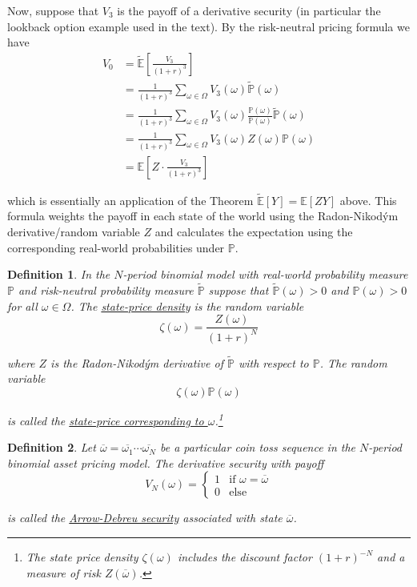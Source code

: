 \documentclass[12pt]{article}
\newtheorem{definition}{Definition}
\newlength\tindent
\renewcommand{\indent}{\hspace*{\tindent}}
\renewcommand{\P}{\mathbb P}
\newcommand{\E}{\mathbb E}
\begin{document}
\indent Now, suppose that $V_3$ is the payoff of a derivative security (in particular the lookback option example used in the text). By the risk-neutral pricing formula we have
\begin{align*}
	V_0 &= \tilde{\E} \left[ \frac{V_3}{(1 + r)^3} \right] \\
	&= \frac{1}{(1 + r)^3} \sum_{\omega\in\Omega} V_3(\omega)\tilde{\P}(\omega) \\
	&= \frac{1}{(1 + r)^3} \sum_{\omega\in\Omega} V_3(\omega) \frac{ \P(\omega) }{ \P(\omega) } \tilde{\P}(\omega) \\
	&= \frac{1}{(1 + r)^3} \sum_{\omega\in\Omega} V_3(\omega) Z(\omega) \P(\omega) \\
	&= \E \left[ Z \cdot \frac{ V_3 }{(1 + r)^3} \right]
\end{align*}

which is essentially an application of the Theorem $\tilde{\E}[Y] = \E[ZY]$ above. This formula weights the payoff in each state of the world using the Radon-Nikod\'{y}m derivative/random variable $Z$ and calculates the expectation using the corresponding real-world probabilities under $\P$.

\begin{definition} In the $N$-period binomial model with real-world probability measure $\P$ and risk-neutral probability measure $\tilde{\P}$ suppose that $\tilde{\P}(\omega) > 0$ and $\P(\omega) > 0$ for all $\omega \in \Omega$. The \underline{state-price density} is the random variable
\begin{equation*}
	\zeta(\omega) = \frac{Z(\omega)}{(1 + r)^N}
\end{equation*}

where $Z$ is the Radon-Nikod\'{y}m derivative of $\tilde{\P}$ with respect to $\P$. The random variable
\begin{equation*}
	\zeta(\omega)\P(\omega)
\end{equation*}

is called the \underline{state-price corresponding to $\omega$}.\footnote{The state price density $\zeta(\omega)$ includes the discount factor $(1 + r)^{-N}$ and a measure of risk $Z(\overline{\omega})$.}
\end{definition}

\begin{definition} Let $\overline{\omega} = \overline{\omega_1} \cdots \overline{\omega_N}$ be a particular coin toss sequence in the $N$-period binomial asset pricing model. The derivative security with payoff
\begin{equation*}
	V_N(\omega) = 
	\begin{cases}
		1 & \text{if } \omega = \overline{\omega} \\
		0 & \text{else}
	\end{cases}
\end{equation*}

is called the \underline{Arrow-Debreu security} associated with state $\overline{\omega}$.
\end{definition}
\end{document}
